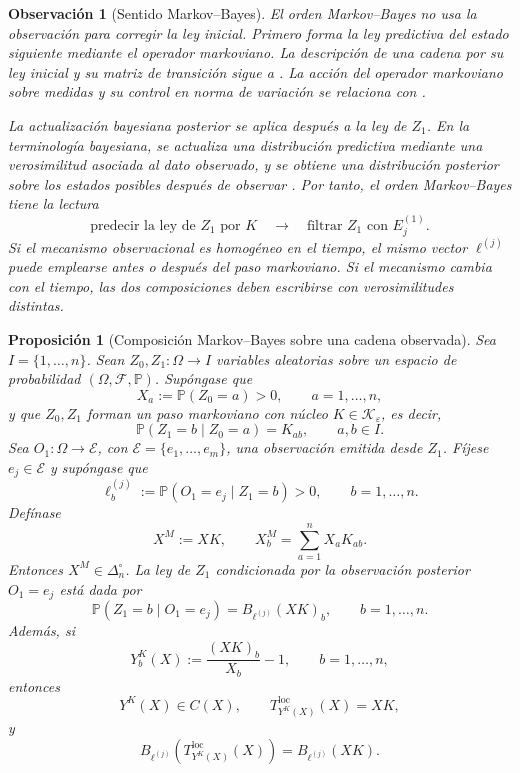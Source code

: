\documentclass[12pt]{article}
\newtheorem{proposicion}{Proposición}[section]
\newtheorem{observacion}{Observación}[section]
\begin{document}
\begin{observacion}[Sentido Markov--Bayes]
El orden Markov--Bayes no usa la observación para corregir la ley inicial. Primero forma la ley predictiva del estado siguiente mediante el operador markoviano. La descripción de una cadena por su ley inicial y su matriz de transición sigue a \citep{Norris1997}. La acción del operador markoviano sobre medidas y su control en norma de variación se relaciona con \citep{GaubertQu2014}.

La actualización bayesiana posterior se aplica después a la ley de \(Z_1\). En la terminología bayesiana, se actualiza una distribución predictiva mediante una verosimilitud asociada al dato observado, y se obtiene una distribución posterior sobre los estados posibles después de observar \citep{Sprungk2020}. Por tanto, el orden Markov--Bayes tiene la lectura
\[
\text{predecir la ley de }Z_1\text{ por }K
\quad\longrightarrow\quad
\text{filtrar }Z_1\text{ con }E_j^{(1)}.
\]
Si el mecanismo observacional es homogéneo en el tiempo, el mismo vector \(\ell^{(j)}\) puede emplearse antes o después del paso markoviano. Si el mecanismo cambia con el tiempo, las dos composiciones deben escribirse con verosimilitudes distintas.
\end{observacion}

\begin{proposicion}[Composición Markov--Bayes sobre una cadena observada]
\label{prop:composicion_MB_kolmogorov}
Sea \(I=\{1,\dots,n\}\). Sean \(Z_0,Z_1:\Omega\to I\) variables aleatorias sobre un espacio de probabilidad \((\Omega,\mathcal F,\mathbb P)\). Supóngase que
\[
X_a:=\mathbb P(Z_0=a)>0,
\qquad a=1,\dots,n,
\]
y que \(Z_0,Z_1\) forman un paso markoviano con núcleo \(K\in\mathcal K_\varepsilon\), es decir,
\[
\mathbb P(Z_1=b\mid Z_0=a)=K_{ab},
\qquad a,b\in I.
\]
Sea \(O_1:\Omega\to\mathcal E\), con \(\mathcal E=\{e_1,\dots,e_m\}\), una observación emitida desde \(Z_1\). Fíjese \(e_j\in\mathcal E\) y supóngase que
\[
\ell_b^{(j)}
:=
\mathbb P(O_1=e_j\mid Z_1=b)>0,
\qquad b=1,\dots,n.
\]
Defínase
\[
X^M:=XK,
\qquad
X_b^M=\sum_{a=1}^nX_aK_{ab}.
\]
Entonces \(X^M\in\Delta_n^\circ\). La ley de \(Z_1\) condicionada por la observación posterior \(O_1=e_j\) está dada por
\[
\mathbb P(Z_1=b\mid O_1=e_j)
=
B_{\ell^{(j)}}(XK)_b,
\qquad b=1,\dots,n.
\]
Además, si
\[
Y_b^K(X):=
\frac{(XK)_b}{X_b}-1,
\qquad b=1,\dots,n,
\]
entonces
\[
Y^K(X)\in C(X),
\qquad
T^{\mathrm{loc}}_{Y^K(X)}(X)=XK,
\]
y
\[
B_{\ell^{(j)}}\!\left(T^{\mathrm{loc}}_{Y^K(X)}(X)\right)
=
B_{\ell^{(j)}}(XK).
\]
\end{proposicion}
\end{document}
